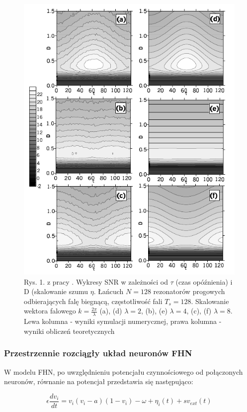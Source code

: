   \begin{figure}
    \includegraphics[width=120mm]{images/krawiecki_jezo_1.png}
    \caption{Rys. 1. z pracy \cite{ijmpb_23_2}. Wykresy SNR w zależności od $\tau$ (czas opóźnienia) i D (skalowanie szumu $\eta$. Łańcuch $N=128$ rezonatorów progowych odbierających falę biegnącą, częstotliwość fali $T_s = 128$. Skalowanie wektora falowego $k=\frac{2\pi}{\lambda}$ (a), (d) $\lambda = 2$, (b), (e) $\lambda = 4$, (c), (f) $\lambda = 8$. Lewa kolumna - wyniki symulacji numerycznej, prawa kolumna - wyniki obliczeń teoretycznych}
    \label{fig:graphics:krawiecki_jezo}
  \end{figure}

  \subsubsection{Przestrzennie rozciągły układ neuronów FHN}
  \label{sec:przestrzennie_rozciagly_fhn}

  W modelu FHN, po uwzględnieniu potencjału czynnościowego od połączonych neuronów, równanie na potencjał przedstawia się następująco:

  \begin{equation} \label{eq:v2}
    \epsilon \frac{dv_i}{dt} = v_i(v_i-a)(1-v_i)- \omega  + \eta_i(t) + sv_{ext}(t)
  \end{equation}

